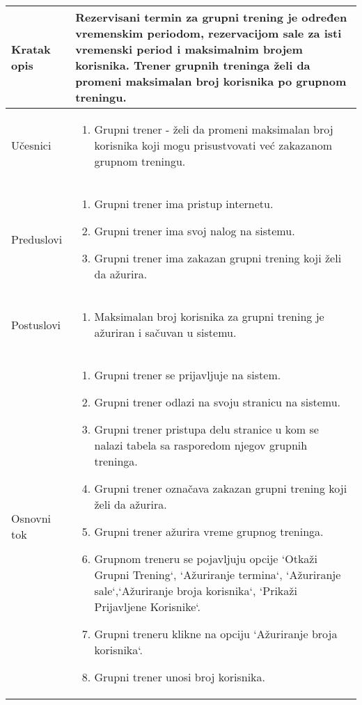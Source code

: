 \documentclass[../grupniTreninzi.tex]{subfiles}
\begin{document}
\begin{longtable}{| p{} | p{} |} 
\hline
    Kratak opis &  Rezervisani termin za grupni trening je određen vremenskim periodom, rezervacijom sale za isti vremenski period i maksimalnim brojem korisnika. Trener grupnih treninga želi da promeni maksimalan broj korisnika po grupnom treningu.\\ 
\hline    
    Učesnici &
    \begin{enumerate}
        \item Grupni trener - želi da promeni maksimalan broj korisnika koji mogu prisustvovati već zakazanom grupnom treningu.
    \end{enumerate}\\
\hline
   Preduslovi & 
   \begin{enumerate}
        \item Grupni trener ima pristup internetu.
        \item Grupni trener ima svoj nalog na sistemu.
        \item Grupni trener ima zakazan grupni trening koji želi da ažurira.
    \end{enumerate}\\
\hline  
    Postuslovi &
    \begin{enumerate}
        \item Maksimalan broj korisnika za grupni trening je ažuriran i sačuvan u sistemu.
    \end{enumerate}\\
\hline
    Osnovni tok & 
    \begin{enumerate}
        \item Grupni trener se prijavljuje na sistem.
        \item Grupni trener odlazi na svoju stranicu na sistemu.
        \item Grupni trener pristupa delu stranice u kom se nalazi tabela sa rasporedom njegov grupnih treninga.
        \item Grupni trener označava zakazan grupni trening koji želi da ažurira.
        \item Grupni trener ažurira vreme grupnog treninga.
        \item Grupnom treneru se pojavljuju opcije `Otkaži Grupni Trening`, `Ažuriranje termina`, `Ažuriranje sale`,`Ažuriranje broja korisnika`, `Prikaži Prijavljene Korisnike`.
        \item Grupni treneru klikne na opciju `Ažuriranje broja korisnika`. 
        \item Grupni trener unosi broj korisnika.

\end{enumerate}
\end{longtable}
\end{document}
